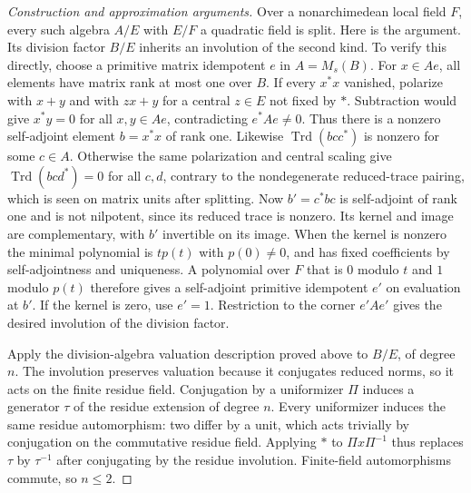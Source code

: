 \documentclass[11pt,a4paper,openany,oneside]{book}
\theoremstyle{resultstyle}
\theoremstyle{definition}
\numberwithin{equation}{chapter}
\begin{document}
\begin{proof}[Construction and approximation arguments]
Over a nonarchimedean local field \(F\), every such algebra
\(A/E\) with \(E/F\) a quadratic field is split. Here is the
argument. Its division factor \(B/E\) inherits an involution
of the second kind. To verify this directly, choose a primitive
matrix idempotent \(e\) in \(A=M_s(B)\). For \(x\in Ae\), all
elements have matrix rank at most one over \(B\). If every
\(x^\ast x\) vanished, polarize with \(x+y\) and with \(zx+y\)
for a central \(z\in E\) not fixed by \(\ast\). Subtraction
would give \(x^\ast y=0\) for all \(x,y\in Ae\),
contradicting \(e^\ast A e\ne0\). Thus there is a nonzero
self-adjoint element \(b=x^\ast x\) of rank one.
Likewise \(\operatorname{Trd}(b c c^\ast)\) is nonzero for
some \(c\in A\). Otherwise the same polarization and central
scaling give \(\operatorname{Trd}(b c d^\ast)=0\) for all
\(c,d\), contrary to the nondegenerate reduced-trace
pairing, which is seen on matrix units after splitting.
Now \(b'=c^\ast b c\) is self-adjoint of rank one and is
not nilpotent, since its reduced trace is nonzero. Its
kernel and image are complementary, with \(b'\) invertible
on its image. When the kernel is nonzero the minimal
polynomial is \(t p(t)\) with \(p(0)\ne0\), and has fixed
coefficients by self-adjointness and uniqueness. A polynomial
over \(F\) that is \(0\) modulo \(t\) and \(1\) modulo
\(p(t)\) therefore gives a self-adjoint primitive
idempotent \(e'\) on evaluation at \(b'\). If the kernel
is zero, use \(e'=1\). Restriction to the corner \(e'Ae'\)
gives the desired involution of the division factor.

Apply the division-algebra valuation description proved above
to \(B/E\), of degree \(n\). The involution preserves valuation
because it conjugates reduced norms, so it acts on the finite
residue field. Conjugation by a uniformizer \(\Pi\) induces a
generator \(\tau\) of the residue extension of degree \(n\).
Every uniformizer induces the same residue automorphism:
two differ by a unit, which acts trivially by conjugation on
the commutative residue field. Applying \(\ast\) to
\(\Pi x\Pi^{-1}\) thus replaces \(\tau\) by \(\tau^{-1}\)
after conjugating by the residue involution. Finite-field
automorphisms commute, so \(n\leq2\).


\end{proof}
\end{document}
